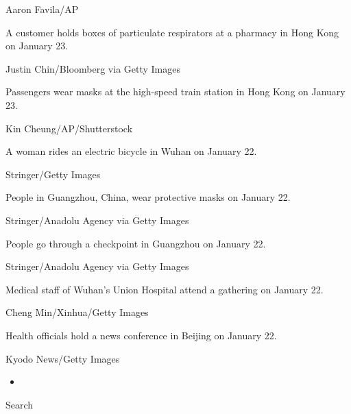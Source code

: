 Aaron Favila/AP

A customer holds boxes of particulate respirators at a pharmacy in Hong
Kong on January 23.

Justin Chin/Bloomberg via Getty Images

Passengers wear masks at the high-speed train station in Hong Kong on
January 23.

Kin Cheung/AP/Shutterstock

A woman rides an electric bicycle in Wuhan on January 22.

Stringer/Getty Images

People in Guangzhou, China, wear protective masks on January 22.

Stringer/Anadolu Agency via Getty Images

People go through a checkpoint in Guangzhou on January 22.

Stringer/Anadolu Agency via Getty Images

Medical staff of Wuhan's Union Hospital attend a gathering on January
22.

Cheng Min/Xinhua/Getty Images

Health officials hold a news conference in Beijing on January 22.

Kyodo News/Getty Images

\begin{itemize}
\item
\end{itemize}

Search

